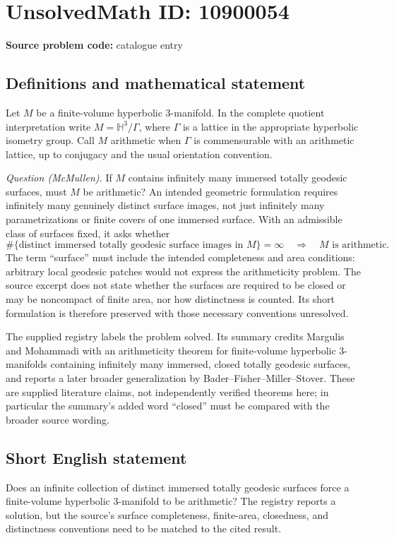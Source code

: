 \documentclass[11pt]{article}
\begin{document}
\section*{UnsolvedMath ID: 10900054}
\textbf{Source problem code:} catalogue entry
\subsection{Definitions and mathematical statement}
Let \(M\) be a finite-volume hyperbolic \(3\)-manifold. In the complete quotient interpretation write \(M=\mathbb H^3/\Gamma\), where \(\Gamma\) is a lattice in the appropriate hyperbolic isometry group. Call \(M\) arithmetic when \(\Gamma\) is commensurable with an arithmetic lattice, up to conjugacy and the usual orientation convention.

\emph{Question (McMullen).} If \(M\) contains infinitely many immersed totally geodesic surfaces, must \(M\) be arithmetic? An intended geometric formulation requires infinitely many genuinely distinct surface images, not just infinitely many parametrizations or finite covers of one immersed surface. With an admissible class of surfaces fixed, it asks whether
\[
 \#\{\text{distinct immersed totally geodesic surface images in }M\}=\infty
 \quad\Longrightarrow\quad M\text{ is arithmetic}.
\]
The term ``surface'' must include the intended completeness and area conditions: arbitrary local geodesic patches would not express the arithmeticity problem. The source excerpt does not state whether the surfaces are required to be closed or may be noncompact of finite area, nor how distinctness is counted. Its short formulation is therefore preserved with those necessary conventions unresolved.

The supplied registry labels the problem solved. Its summary credits Margulis and Mohammadi with an arithmeticity theorem for finite-volume hyperbolic \(3\)-manifolds containing infinitely many immersed, closed totally geodesic surfaces, and reports a later broader generalization by Bader--Fisher--Miller--Stover. These are supplied literature claims, not independently verified theorems here; in particular the summary's added word ``closed'' must be compared with the broader source wording.
\subsection{Short English statement}
Does an infinite collection of distinct immersed totally geodesic surfaces force a finite-volume hyperbolic \(3\)-manifold to be arithmetic? The registry reports a solution, but the source's surface completeness, finite-area, closedness, and distinctness conventions need to be matched to the cited result.
\end{document}
